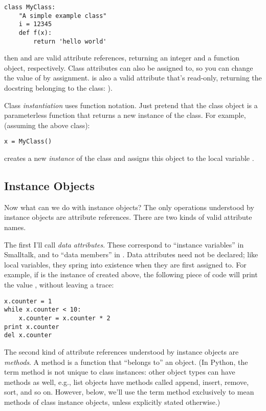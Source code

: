 \documentclass{manual}
\begin{document}
\begin{verbatim}
class MyClass:
    "A simple example class"
    i = 12345
    def f(x):
        return 'hello world'
\end{verbatim}

then  and  are valid attribute
references, returning an integer and a function object, respectively.
Class attributes can also be assigned to, so you can change the value
of  by assignment.   is also a valid
attribute that's read-only, returning the docstring belonging to
the class: ).  

Class \emph{instantiation} uses function notation.  Just pretend that
the class object is a parameterless function that returns a new
instance of the class.  For example, (assuming the above class):

\begin{verbatim}
x = MyClass()
\end{verbatim}

creates a new \emph{instance} of the class and assigns this object to
the local variable .


\subsection{Instance Objects \label{instanceObjects}}

Now what can we do with instance objects?  The only operations
understood by instance objects are attribute references.  There are
two kinds of valid attribute names.

The first I'll call \emph{data attributes}.  These correspond to
``instance variables'' in Smalltalk, and to ``data members'' in
\Cpp{}.  Data attributes need not be declared; like local variables,
they spring into existence when they are first assigned to.  For
example, if  is the instance of  created above,
the following piece of code will print the value , without
leaving a trace:

\begin{verbatim}
x.counter = 1
while x.counter < 10:
    x.counter = x.counter * 2
print x.counter
del x.counter
\end{verbatim}

The second kind of attribute references understood by instance objects
are \emph{methods}.  A method is a function that ``belongs to'' an
object.  (In Python, the term method is not unique to class instances:
other object types can have methods as well, e.g., list objects have
methods called append, insert, remove, sort, and so on.  However,
below, we'll use the term method exclusively to mean methods of class
instance objects, unless explicitly stated otherwise.)
\end{document}
